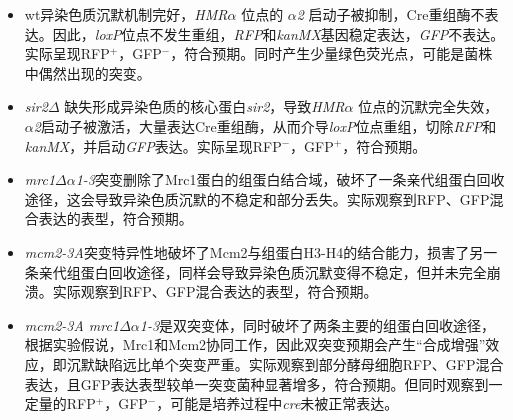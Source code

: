 \documentclass[a4,10pt]{article}
\begin{document}
\begin{itemize}
    \item wt异染色质沉默机制完好，\textit{HMR}$\alpha$ 位点的 $\alpha$\textit{2} 启动子被抑制，Cre重组酶不表达。因此，\textit{loxP}位点不发生重组，\textit{RFP}和\textit{kanMX}基因稳定表达，\textit{GFP}不表达。实际呈现RFP$^+$，GFP$^-$，符合预期。同时产生少量绿色荧光点，可能是菌株中偶然出现的突变。
    
    \item \textit{sir2}$\Delta$ 缺失形成异染色质的核心蛋白\textit{sir2}，导致\textit{HMR}$\alpha$ 位点的沉默完全失效，$\alpha$\textit{2}启动子被激活，大量表达Cre重组酶，从而介导\textit{loxP}位点重组，切除\textit{RFP}和\textit{kanMX}，并启动\textit{GFP}表达。实际呈现RFP$^-$，GFP$^+$，符合预期。

    \item \textit{mrc1}$\Delta \alpha$\textit{1-3}突变删除了Mrc1蛋白的组蛋白结合域，破坏了一条亲代组蛋白回收途径，这会导致异染色质沉默的不稳定和部分丢失。实际观察到RFP、GFP混合表达的表型，符合预期。

    \item \textit{mcm2-3A}突变特异性地破坏了Mcm2与组蛋白H3-H4的结合能力，损害了另一条亲代组蛋白回收途径，同样会导致异染色质沉默变得不稳定，但并未完全崩溃。实际观察到RFP、GFP混合表达的表型，符合预期。

    \item \textit{mcm2-3A mrc1}$\Delta \alpha$\textit{1-3}是双突变体，同时破坏了两条主要的组蛋白回收途径，根据实验假说，Mrc1和Mcm2协同工作，因此双突变预期会产生“合成增强”效应，即沉默缺陷远比单个突变严重。实际观察到部分酵母细胞RFP、GFP混合表达，且GFP表达表型较单一突变菌种显著增多，符合预期。但同时观察到一定量的RFP$^+$，GFP$^-$，可能是培养过程中\textit{cre}未被正常表达。
\end{itemize}
\end{document}
